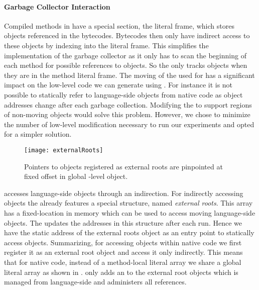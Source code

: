 \paragraph{Garbage Collector Interaction}

Compiled methods in \PH have a special section, the literal frame, which stores objects referenced in the bytecodes.
Bytecodes then only have indirect access to these objects by indexing into the literal frame.
This simplifies the implementation of the garbage collector as it only has to scan the beginning of each method for possible references to objects. 
So the \GC only tracks \PH objects when they are in the method literal frame. 
The moving \GC of the \VM used for \PH has a significant impact on the low-level code we can generate using \B.
For instance it is not possible to statically refer to language-side objects from native code as object addresses change after each garbage collection.
Modifying the \GC to support regions of non-moving objects would solve this problem.
However, we chose to minimize the number of low-level \VM modification necessary to run our experiments and opted for a simpler solution.

\begin{figure}[ht]
	\centering
	\texttt{[image: externalRoots]}
	\caption[Benzo External Roots]{Pointers to objects registered as external roots are pinpointed at fixed offset in global \VM-level object.
	}
\end{figure}

\noindent \B accesses language-side objects through an indirection.
For indirectly accessing objects the \PH \VM already features a special structure, named \emph{external roots}.
This array has a fixed-location in memory which can be used to access moving language-side objects.
The \GC updates the addresses in this \VM structure after each run.
Hence we have the static address of the external roots object as an entry point to statically access \PH objects.
Summarizing, for accessing \PH objects within native code we first register it as an external root object and access it only indirectly.
This means that for native code, instead of a method-local literal array we share a global literal array as shown in . 
\B only adds an  to the external root objects which is managed from language-side and administers all references.

